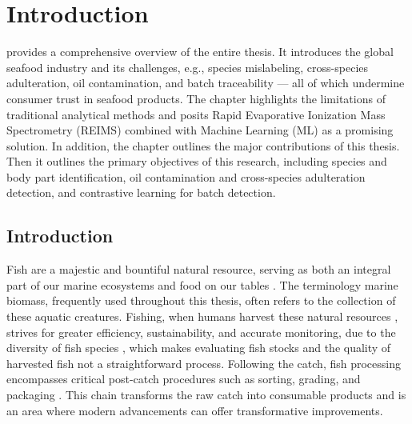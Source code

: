 \chapter{Introduction}
\label{chapter:introduction}


 provides a comprehensive overview of the entire thesis. It introduces the global seafood industry and its challenges, e.g., species mislabeling, cross-species adulteration, oil contamination, and batch traceability --- all of which undermine consumer trust in seafood products. The chapter highlights the limitations of traditional analytical methods and posits Rapid Evaporative Ionization Mass Spectrometry (REIMS) combined with Machine Learning (ML) as a promising solution. In addition, the chapter outlines the major contributions of this thesis. Then it outlines the primary objectives of this research, including species and body part identification, oil contamination and cross-species adulteration detection, and contrastive learning for batch detection.

\section{Introduction}

Fish are a majestic and bountiful natural resource, serving as both an integral part of our marine ecosystems and food on our tables \citep{FAOUN2024}. The terminology marine biomass, frequently used throughout this thesis, often refers to the collection of these aquatic creatures. Fishing, when humans harvest these natural resources \citep{Jennings2001}, strives for greater efficiency, sustainability, and accurate monitoring, due to the diversity of fish species \citep{OECD2021}, which makes evaluating fish stocks and the quality of harvested fish not a straightforward process. Following the catch, fish processing encompasses critical post-catch procedures such as sorting, grading, and packaging \citep{Fellows2017}. This chain transforms the raw catch into consumable products and is an area where modern advancements can offer transformative improvements.

